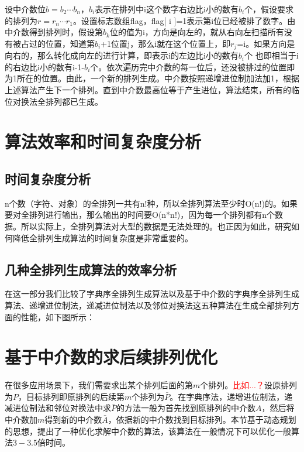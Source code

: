 \documentclass[6pt, twocolumn]{ctexart}
\begin{document}
设中介数位$b = b_2\cdots b_{n}$，$b_i$表示在排列中i这个数字右边比i小的数有$b_i$个，假设要求的排列为$r= r_n\cdots r_1$。设置标志数组flag，flag[ i ]=1表示第i位已经被排了数字。由中介数得到排列时，假设第$b_k$位的值为i，方向是向左的，就从右向左扫描所有没有被占过的位置，知道第$b_i$+1位置j，那么i就在这个位置上，即$r_j$=i。如果方向是向右的，那么转化成向左的进行计算，即表示i的左边比i小的数有$b_i$个 也即相当于i的右边比i小的数有i-1-$b_i$个。依次遍历完中介数的每一位后，还没被排过的位置即为1所在的位置。由此，一个新的排列生成。中介数按照递增进位制加法加1，根据上述算法产生下一个排列。直到中介数最高位等于产生进位，算法结束，所有的临位对换法全排列都已生成。

\section{算法效率和时间复杂度分析}
\subsection{时间复杂度分析}
n个数（字符、对象）的全排列一共有n!种，所以全排列算法至少时O(n!)的。如果要对全排列进行输出，那么输出的时间要O(n*n!)，因为每一个排列都有n个数据。所以实际上，全排列算法对大型的数据是无法处理的。也正因为如此，研究如何降低全排列生成算法的时间复杂度是非常重要的。
\subsection{几种全排列生成算法的效率分析}
在这一部分我们比较了字典序全排列生成算法以及基于中介数的字典序全排列生成算法、递增进位制法，递减进位制法以及邻位对换法这五种算法在生成全部排列方面的性能，如下图所示：

{\color{red}{插入图片}}







\section{基于中介数的求后续排列优化}
在很多应用场景下，我们需要求出某个排列后面的第$m$个排列。\textcolor{red}{比如...？}设原排列为$P$，目标排列即原排列的后续第$m$个排列为$\bar{P}$。在字典序法，递增进位制法，递减进位制法和邻位对换法中求$\bar{P}$的方法一般为首先找到原排列的中介数$A$，然后将中介数加$m$得到新的中介数$\bar{A}$，依据新的中介数找到目标排列。本节基于动态规划的思想，提出了一种优化求解中介数的算法，该算法在一般情况下可以优化一般算法$3-3.5$倍时间。
\end{document}
